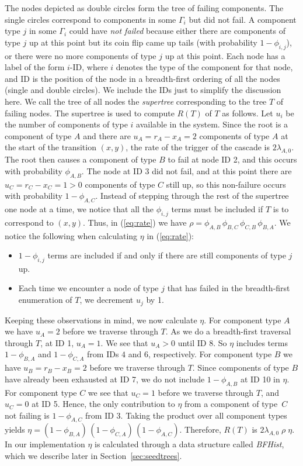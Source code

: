 \documentclass[12pt]{article}
\newcommand{\varName}[1]{\textrm{\it#1}}
\begin{document}
The nodes depicted as double circles form the tree of failing components. The single circles correspond to components in some $\Gamma_i$ but did not fail.  A component type $j$ in some $\Gamma_i$ could have \textit{not failed} because either there are components of type $j$ up at this point but its coin flip came up tails (with probability $1 - \phi_{i, j}$), or there were no more components of type $j$ up at this point. Each node has a label of the form $i$-ID, where $i$ denotes the type of the component for that node, and ID is the position of the node in a breadth-first ordering of all the nodes (single and double circles). We include the IDs just to simplify the discussion here. We call the tree of all nodes the \textit{supertree} corresponding to the tree $T$ of failing nodes. The supertree is used to compute $R(T)$ of $T$ as follows. Let $u_i$ be the number of components of type $i$ available in the system. Since the root is a component of type $A$ and there are $u_A = r_A - x_A = 2$ components of type $A$ at the start of the transition $(x, y)$, the rate of the trigger of the cascade is $2 \lambda_{A, 0}$. The root then causes a component of type $B$ to fail at node ID 2, and this occurs with probability $\phi_{A, B}$. The node at ID 3 did not fail, and at this point there are $u_C = r_C - x_C = 1 > 0$ components of type $C$ still up, so this non-failure occurs with probability $1 - \phi_{A,C}$. Instead of stepping through the rest of the supertree one node at a time, we notice that all the $\phi_{i, j}$ terms must be included if $T$ is to correspond to $(x, y)$. Thus, in (\ref{eq:rate}) we have $\rho = \phi_{A, B} \, \phi_{B, C} \, \phi_{C, B} \, \phi_{B, A}$.
We notice the following when calculating $\eta$ in (\ref{eq:rate}): 
\begin{itemize} 
\item $1 - \phi_{i, j}$ terms are included if and only if there are still components of type $j$ up.
\item Each time we encounter a node of type $j$ that has failed in the breadth-first enumeration of $T$, we decrement $u_j$ by 1. 
\end{itemize}
Keeping these observations in mind, we now calculate $\eta$. For component type $A$ we have $u_A = 2$ before we traverse through $T$. As we do a breadth-first traversal through $T$, at ID 1, $u_A = 1$. We see that $u_A > 0$ until ID 8. So $\eta$ includes terms $1 - \phi_{B, A}$ and $1 - \phi_{C, A}$ from IDs $4$ and $6$, respectively. For component type $B$ we have $u_B = r_B - x_B  = 2$ before we traverse through $T$. Since components of type $B$ have already been exhausted at ID 7, we do not include $1 - \phi_{A, B}$ at ID 10 in $\eta$. For component type $C$ we see that $u_C = 1$ before we traverse through $T$, and $u_C = 0$ at ID 5. Hence, the only contribution to $\eta$ from a component of type~$C$ not failing is $1 - \phi_{A, C}$ from ID 3. Taking the product over all component types yields $\eta = (1 - \phi_{B, A}) \, (1 - \phi_{C, A}) \, (1 - \phi_{A,C})$. Therefore, $R(T)$ is $2 \lambda_{A, 0} \; \rho \; \eta$. In our implementation $\eta$ is calculated through a data structure called \varName{BFHist}, which we describe later in Section~\ref{sec:seedtrees}.
\end{document}
